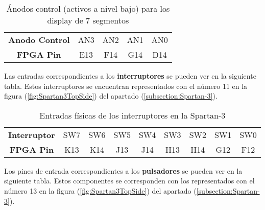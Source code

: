     \begin{table}[H]
            \centering
            \begin{tabular}{|c|c|c|c|c|}
                \hline
                \rowcolor[rgb]{0.21,0.69,0.87}\multicolumn{5}{|c|}{  \textbf{ {Ánodos de control}}} \\
                \hline \hline
                \textbf{  Anodo Control  } & AN3 & AN2 & AN1 & AN0  \\
                \hline
                \textbf{  FPGA Pin  } & E13 & F14 & G14 & D14  \\
                \hline
                 
            \end{tabular}
        \caption{ Ánodos control (activos a nivel bajo) para los display de 7 segmentos }
        \label{tab:anodoControl}
    \end{table}

    Las entradas correspondientes a los \textbf{interruptores} se pueden ver en la siguiente tabla. Estos interruptores se encuentran representados con el número 11 en la figura (\ref{fig:Spartan3TopSide}) del apartado (\ref{subsection:Spartan-3}).

    \begin{table}[H]
            \centering
            \begin{tabular}{|c|c|c|c|c|c|c|c|c|}
                \hline
                \rowcolor[rgb]{0.21,0.69,0.87}\multicolumn{9}{|c|}{  \textbf{ {Entradas Interruptores}}} \\
                \hline \hline
                \textbf{  Interruptor  } & SW7 & SW6 & SW5 & SW4 & SW3 & SW2 & SW1 & SW0 \\
                \hline
                \textbf{  FPGA Pin  } & K13 & K14 & J13 & J14 & H13 & H14 & G12 & F12 \\
                \hline
                 
            \end{tabular}
        \caption{ Entradas físicas de los interruptores en la Spartan-3 }
        \label{tab:tablaEntradasInterruptores}
    \end{table}

    Los pines de entrada correspondientes a los \textbf{pulsadores} se pueden ver en la siguiente tabla. Estos componentes se corresponden con los representados con el número 13 en la figura (\ref{fig:Spartan3TopSide}) del apartado (\ref{subsection:Spartan-3}).

